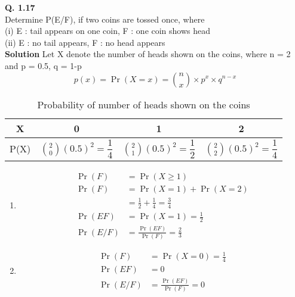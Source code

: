\documentclass[journal,12pt,twocoloums]{IEEEtran}
\begin{document}
\maketitle
\noindent 
\textbf{Q. 1.17}\\
Determine P(E/F), if two coins are
tossed once, where\\
(i) E : tail appears on one coin, F : one coin
shows head\\
(ii) E : no tail appears, F : no head appears\vspace{0.5cm}\\
\textbf{Solution}
Let X denote the number of heads shown on the coins, where n = 2 and p = 0.5, q = 1-p
$$p(x) = \Pr(X=x) = \binom{n}{x}\times p^x\times q^{n-x}$$ 
\begin{table}[H]
\resizebox{9cm}{0.8cm} {
\begin{tabular}{|c|c|c|c|}
\hline
     X&0&1&2  \\
     \hline
     P(X)&$\binom{2}{0}(0.5)^2=\dfrac{1}{4}$&$\binom{2}{1}(0.5)^2 = \dfrac{1}{2}$&$\binom{2}{2}(0.5)^2 = \dfrac{1}{4}$\\
     \hline
\end{tabular}
}
\caption{Probability of number of heads shown on the coins }
\label{table:1}
\end{table}
\begin{enumerate}[label=\roman*]
\item 
\begin{align}
\Pr(F) &= \Pr(X\geq 1)\\
\Pr(F) &= \Pr(X = 1) + \Pr(X = 2)\\
       &= \frac{1}{2} + \frac{1}{4} = \frac{3}{4}\nonumber\\
\Pr(EF) &= \Pr(X = 1) = \frac{1}{2}\\
\Pr(E/F) &=\frac{\Pr(EF)}{\Pr(F)} = \frac{2}{3}
\end{align}
\item
\begin{align}
\Pr(F) &= \Pr(X = 0) = \frac{1}{4}\\
\Pr(EF) &= 0\\
\Pr(E/F) &= \frac{\Pr(EF)}{\Pr(F)} = 0
\end{align} 
\end{enumerate}





\end{document}

